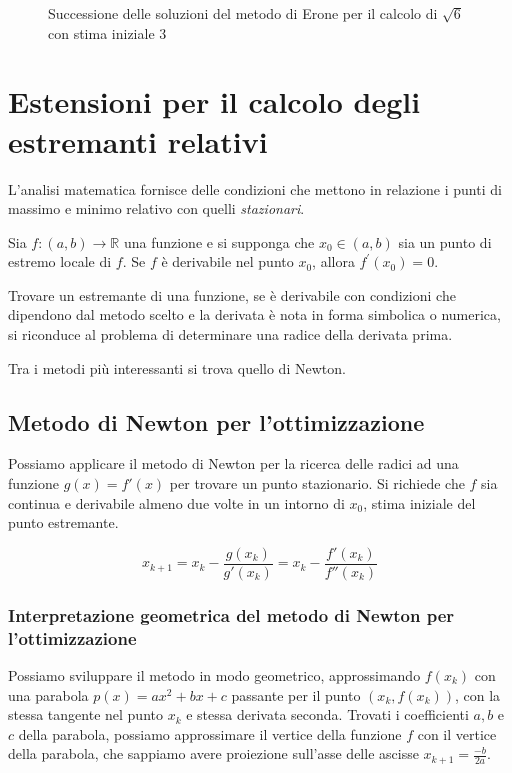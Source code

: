 \begin{figure}[!htbp]
    \centering
    
    \caption{Successione delle soluzioni del metodo di Erone per il calcolo di $\sqrt{6}$ con stima iniziale 3}
    \label{fig:geo_erone_sqrt_6}
\end{figure}

\section{Estensioni per il calcolo degli estremanti relativi}

L'analisi matematica fornisce delle condizioni che mettono in relazione i punti
di massimo e minimo relativo con quelli \textit{stazionari}.

\begin{thm}
Sia $f :(a, b) \to \mathbb{R}$ una funzione e si supponga che $x_0 \in  (a, b)$
sia un punto di estremo locale di $f$. Se $f$ è derivabile nel punto $x_0$,
allora $f^{\prime}(x_0) = 0$.
\end{thm}

Trovare un estremante di una funzione, se è derivabile con condizioni che
dipendono dal metodo scelto e la derivata è nota in forma simbolica o numerica,
si riconduce al problema di determinare una radice della derivata prima.

Tra i metodi più interessanti si trova quello di Newton.

\subsection{Metodo di Newton per l'ottimizzazione}

Possiamo applicare il metodo di Newton per la ricerca delle radici ad una
funzione $g(x) = f'(x)$ per trovare un punto stazionario. Si richiede che $f$
sia continua e derivabile almeno due volte in un intorno di $x_0$, stima iniziale
del punto estremante.

$$x_{k + 1} = x_k - \frac{g(x_k)}{g'(x_k)} = x_k - \frac{f'(x_k)}{f''(x_k)}$$

\subsubsection[Interpretazione geometrica]{Interpretazione geometrica del metodo di Newton per l'ottimizzazione}

Possiamo sviluppare il metodo in modo geometrico, approssimando $f(x_k)$ con una parabola $p(x) = a x^2 + bx + c$
passante per il punto $\left(x_k, f(x_k)\right)$, con la stessa tangente nel punto $x_k$ e stessa derivata seconda.
Trovati i coefficienti $a, b$ e $c$ della parabola, possiamo approssimare il vertice della funzione $f$
con il vertice della parabola, che sappiamo avere proiezione sull'asse delle ascisse $x_{k+1} = \frac{-b}{2a}$.

